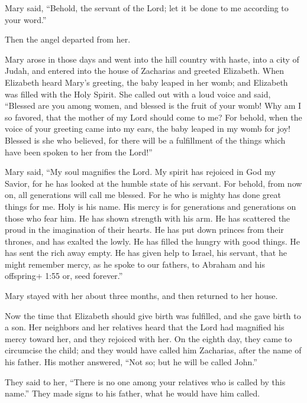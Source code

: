  Mary said, ``Behold, the servant of the Lord; let it be
done to me according to your word.''

Then the angel departed from her.

 Mary arose in those days and went into the hill country
with haste, into a city of Judah,  and entered into the
house of Zacharias and greeted Elizabeth.  When Elizabeth
heard Mary's greeting, the baby leaped in her womb; and Elizabeth was
filled with the Holy Spirit.  She called out with a loud
voice and said, ``Blessed are you among women, and blessed is the fruit
of your womb!  Why am I so favored, that the mother of my
Lord should come to me?  For behold, when the voice of your
greeting came into my ears, the baby leaped in my womb for joy!
 Blessed is she who believed, for there will be a
fulfillment of the things which have been spoken to her from the Lord!''

 Mary said, ``My soul magnifies the Lord.  My
spirit has rejoiced in God my Savior,  for he has looked at
the humble state of his servant. For behold, from now on, all
generations will call me blessed.  For he who is mighty has
done great things for me. Holy is his name.  His mercy is
for generations and generations on those who fear him.  He
has shown strength with his arm. He has scattered the proud in the
imagination of their hearts.  He has put down princes from
their thrones, and has exalted the lowly.  He has filled
the hungry with good things. He has sent the rich away empty.
 He has given help to Israel, his servant, that he might
remember mercy,  as he spoke to our fathers, to Abraham and
his offspring+ 1:55 or, seed forever.''

 Mary stayed with her about three months, and then returned
to her house.

 Now the time that Elizabeth should give birth was
fulfilled, and she gave birth to a son.  Her neighbors and
her relatives heard that the Lord had magnified his mercy toward her,
and they rejoiced with her.  On the eighth day, they came
to circumcise the child; and they would have called him Zacharias, after
the name of his father.  His mother answered, ``Not so; but
he will be called John.''

 They said to her, ``There is no one among your relatives
who is called by this name.''  They made signs to his
father, what he would have him called.

